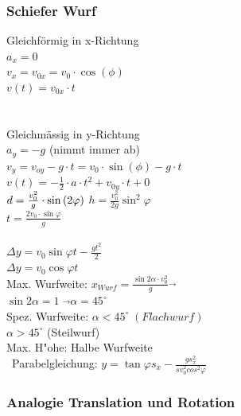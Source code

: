	\subsubsection{Schiefer Wurf}
\begin{multicols}{3}
	Gleichförmig in x-Richtung \\
	$a_{x} = 0$ \\
	$v_{x} = v_{0x} = v_0 \cdot \cos(\phi)$ \\
	$v(t)= v_{0x} \cdot t $\\
	\\
\columnbreak
	\\
	Gleichmässig in y-Richtung \\
	$a_{y} = -g$ (nimmt immer ab)\\
	$v_{y} = v_{oy} - g \cdot t = v_0 \cdot \sin(\phi) - g \cdot t $ \\
	$v(t) = -\frac{1}{2} \cdot a \cdot t^2 + v_{0y} \cdot t + 0$ \\
	$d = \frac{v_{0}^2}{g} \cdot \sin{(2\varphi)} \\$
	$h = \frac{v_{0}^2}{2g}\sin^2{\varphi}$ \\
	$t = \frac{2v_{0} \cdot \sin{\varphi}}{g}$ \\
\columnbreak
\\
	$\Delta y = v_{0}\sin{\varphi}t - \frac{gt^2}{2}$ \\
	$\Delta y = v_{0}\cos{\varphi}t$ \\
	Max. Wurfweite: $x_{Wurf} = \frac{\sin2\alpha \cdot v_{0}^2}{g} \overrightarrow{}$ \\ $\sin2\alpha = 1 \; \overrightarrow{} \alpha = 45^\circ$ \\
	Spez. Wurfweite: $\alpha < 45^\circ \; (Flachwurf)$ \\
	$ \alpha > 45^\circ$ \; (Steilwurf)\\
	Max. H"ohe: Halbe Wurfweite \\
\	Parabelgleichung: $y = \tan{\varphi}s_{x} - \frac{gs_{x}^2}{sv_{0}^2cos^2{\varphi}}$ \\
\end{multicols}
					
\subsubsection{Analogie Translation und Rotation}
